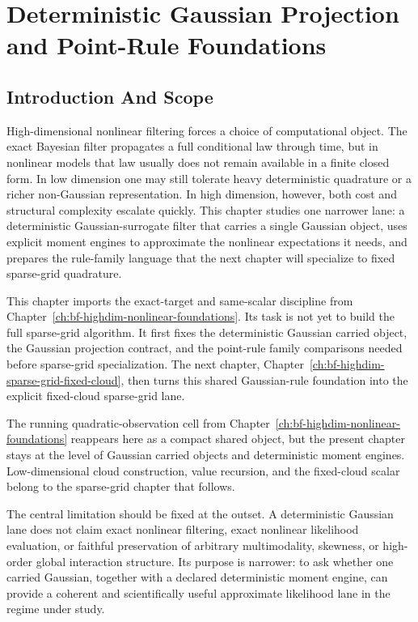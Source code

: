 \chapter{Deterministic Gaussian Projection and Point-Rule Foundations}
\label{ch:bf-highdim-gaussian-point-rule-foundations}
\providecommand{\widehatell}{\widehat{\ell}}
\providecommand{\dotwidehatell}{\dot{\widehat{\ell}}}
\providecommand{\dd}{\,\mathrm d}

\section{Introduction And Scope}
\label{sec:bf-hd-gq-intro}

High-dimensional nonlinear filtering forces a choice of computational object.
The exact Bayesian filter propagates a full conditional law through time, but in
nonlinear models that law usually does not remain available in a finite closed
form.  In low dimension one may still tolerate heavy deterministic quadrature or
a richer non-Gaussian representation.  In high dimension, however, both cost and
structural complexity escalate quickly.  This chapter studies one narrower lane:
a deterministic Gaussian-surrogate filter that carries a single Gaussian object,
uses explicit moment engines to approximate the nonlinear expectations it needs,
and prepares the rule-family language that the next chapter will specialize to
fixed sparse-grid quadrature.

This chapter imports the exact-target and same-scalar discipline from
Chapter~\ref{ch:bf-highdim-nonlinear-foundations}.  Its task is not yet to build
the full sparse-grid algorithm.  It first fixes the deterministic Gaussian
carried object, the Gaussian projection contract, and the point-rule family
comparisons needed before sparse-grid specialization.  The next chapter,
Chapter~\ref{ch:bf-highdim-sparse-grid-fixed-cloud}, then turns this shared
Gaussian-rule foundation into the explicit fixed-cloud sparse-grid lane.

The running quadratic-observation cell from
Chapter~\ref{ch:bf-highdim-nonlinear-foundations} reappears here as a compact
shared object, but the present chapter stays at the level of Gaussian carried
objects and deterministic moment engines.  Low-dimensional cloud construction,
value recursion, and the fixed-cloud scalar belong to the sparse-grid chapter
that follows.

The central limitation should be fixed at the outset.  A deterministic Gaussian
lane does not claim exact nonlinear filtering, exact nonlinear likelihood
evaluation, or faithful preservation of arbitrary multimodality, skewness, or
high-order global interaction structure.  Its purpose is narrower: to ask
whether one carried Gaussian, together with a declared deterministic moment
engine, can provide a coherent and scientifically useful approximate likelihood
lane in the regime under study.

